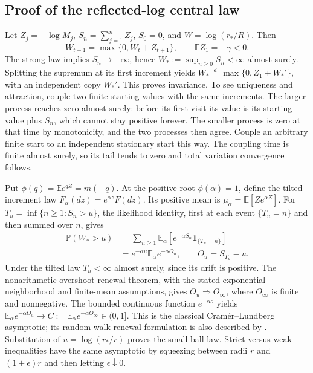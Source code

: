 \subsection{Proof of the reflected-log central law}
Let \(Z_j=-\log M_j\), \(S_n=\sum_{j=1}^nZ_j\), \(S_0=0\), and
\(W=\log(r_*/R)\). Then
\[
 W_{t+1}=\max\{0,W_t+Z_{t+1}\},\qquad \mathbb EZ_1=-\gamma<0.
\]
The strong law implies \(S_n\to-\infty\), hence
\(W_*:=\sup_{n\ge0}S_n<\infty\) almost surely. Splitting the supremum
at its first increment yields
\(W_*\overset d=\max\{0,Z_1+W_*'\}\), with an independent copy
\(W_*'\). This proves invariance. To see uniqueness and attraction,
couple two finite starting values with the same increments. The larger
process reaches zero almost surely: before its first visit its value is
its starting value plus \(S_n\), which cannot stay positive forever.
The smaller process is zero at that time by monotonicity, and the two
processes then agree. Couple an arbitrary finite start to an independent
stationary start this way. The coupling time is finite almost surely,
so its tail tends to zero and total variation convergence follows.

Put \(\phi(q)=\mathbb E e^{qZ}=m(-q)\). At the positive root
\(\phi(\alpha)=1\), define the tilted increment law
\(F_\alpha(dz)=e^{\alpha z}F(dz)\). Its positive mean is
\(\mu_\alpha=\mathbb E[Ze^{\alpha Z}]\). For
\(T_u=\inf\{n\ge1:S_n>u\}\), the likelihood identity, first at each
event \(\{T_u=n\}\) and then summed over \(n\), gives
\begin{align*}
 \mathbb P(W_*>u)
 &=\sum_{n\ge1}\mathbb E_\alpha
       [e^{-\alpha S_n}\mathbf1_{\{T_u=n\}}]\\
 &=e^{-\alpha u}\mathbb E_\alpha e^{-\alpha O_u},
 \qquad O_u=S_{T_u}-u.
\end{align*}
Under the tilted law \(T_u<\infty\) almost surely, since its drift is
positive. The nonarithmetic overshoot renewal theorem, with the stated
exponential-neighborhood and finite-mean assumptions, gives
\(O_u\Rightarrow O_\infty\), where \(O_\infty\) is finite and
nonnegative. The bounded continuous function \(e^{-\alpha o}\) yields
\(\mathbb E_\alpha e^{-\alpha O_u}\to
C:=\mathbb E_\alpha e^{-\alpha O_\infty}\in(0,1]\).
This is the classical Cram\'er--Lundberg asymptotic; its random-walk
renewal formulation is also described by
\citet{blanchet2006corrected}.
Substitution of \(u=\log(r_*/r)\) proves the small-ball law.
Strict versus weak inequalities have the same asymptotic by squeezing
between radii \(r\) and \((1+\epsilon)r\) and then letting
\(\epsilon\downarrow0\).

